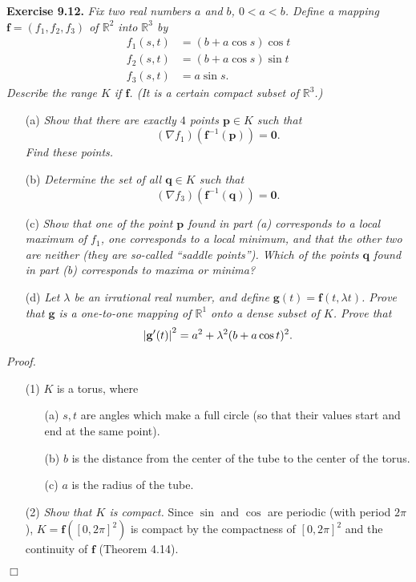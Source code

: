 \documentclass{article}
\begin{document}



\textbf{Exercise 9.12.}
\emph{Fix two real numbers $a$ and $b$, $0<a<b$.
Define a mapping $\mathbf{f}=(f_1,f_2,f_3)$ of $\mathbb{R}^2$ into $\mathbb{R}^3$ by
\begin{align*}
  f_1(s,t) &= (b + a\cos s)\cos t \\
  f_2(s,t) &= (b + a\cos s)\sin t \\
  f_3(s,t) &= a \sin s.
\end{align*}
Describe the range $K$ if $\mathbf{f}$.
(It is a certain compact subset of $\mathbb{R}^3$.)}
\begin{enumerate}
\item[(a)]
  \emph{Show that there are exactly $4$ points $\mathbf{p} \in K$ such that
  \[
    (\nabla f_1)(\mathbf{f}^{-1}(\mathbf{p})) = \mathbf{0}.
  \]
  Find these points.}

\item[(b)]
  \emph{Determine the set of all $\mathbf{q} \in K$ such that
  \[
    (\nabla f_3)(\mathbf{f}^{-1}(\mathbf{q})) = \mathbf{0}.
  \]}
\item[(c)]
  \emph{Show that
  one of the point $\mathbf{p}$ found in part (a) corresponds to a local maximum of $f_1$,
  one corresponds to a local minimum,
  and that the other two are neither (they are so-called ``saddle points'').
  Which of the points $\mathbf{q}$ found in part (b) corresponds to maxima or minima?}

\item[(d)]
  \emph{Let $\lambda$ be an irrational real number, and define
  $\mathbf{g}(t) = \mathbf{f}(t,\lambda t)$.
  Prove that $\mathbf{g}$ is a one-to-one mapping of $\mathbb{R}^1$
  onto a dense subset of $K$.
  Prove that
  \[
    \abs{ \mathbf{g}'(t) }^2= a^2 + \lambda^2(b + a \cos t)^2.
  \]}
\end{enumerate}



\emph{Proof.}
\begin{enumerate}
\item[(1)]
  $K$ is a torus,
  where
  \begin{enumerate}
  \item[(a)]
    $s, t$ are angles which make a full circle
    (so that their values start and end at the same point).
  \item[(b)]
    $b$ is the distance from the center of the tube to the center of the torus.
  \item[(c)]
    $a$ is the radius of the tube.
  \end{enumerate}

\item[(2)]
  \emph{Show that $K$ is compact.}
  Since $\sin$ and $\cos$ are periodic (with period $2\pi$),
  $K = \mathbf{f}\left([0,2\pi]^2\right)$ is compact
  by the compactness of $[0,2\pi]^2$ and the continuity of $\mathbf{f}$ (Theorem 4.14).

\end{enumerate}
$\Box$ \\
\end{document}
